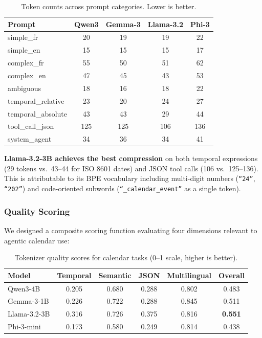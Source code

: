 \documentclass[11pt,a4paper]{article}
\begin{document}
\begin{table}[H]
\centering
\caption{Token counts across prompt categories. Lower is better.}
\label{tab:token_counts}
\small
\begin{tabular}{lcccc}
\toprule
\textbf{Prompt} & \textbf{Qwen3} & \textbf{Gemma-3} & \textbf{Llama-3.2} & \textbf{Phi-3} \\
\midrule
simple\_fr & 20 & 19 & 19 & 22 \\
simple\_en & 15 & 15 & 15 & 17 \\
complex\_fr & 55 & 50 & 51 & 62 \\
complex\_en & 47 & 45 & 43 & 53 \\
ambiguous & 18 & 16 & 18 & 22 \\
temporal\_relative & 23 & 20 & 24 & 27 \\
temporal\_absolute & 43 & 43 & 29 & 44 \\
tool\_call\_json & 125 & 125 & 106 & 136 \\
system\_agent & 34 & 36 & 34 & 41 \\
\bottomrule
\end{tabular}
\end{table}

\textbf{Llama-3.2-3B achieves the best compression} on both temporal expressions (29 tokens vs.\ 43--44 for ISO 8601 dates) and JSON tool calls (106 vs.\ 125--136). This is attributable to its BPE vocabulary including multi-digit numbers (\texttt{``24''}, \texttt{``202''}) and code-oriented subwords (\texttt{``\_calendar\_event''} as a single token).

\subsubsection{Quality Scoring}

We designed a composite scoring function evaluating four dimensions relevant to agentic calendar use:

\begin{table}[H]
\centering
\caption{Tokenizer quality scores for calendar tasks (0--1 scale, higher is better).}
\label{tab:quality_scores}
\begin{tabular}{lccccc}
\toprule
\textbf{Model} & \textbf{Temporal} & \textbf{Semantic} & \textbf{JSON} & \textbf{Multilingual} & \textbf{Overall} \\
\midrule
Qwen3-4B & 0.205 & 0.680 & 0.288 & 0.802 & 0.483 \\
Gemma-3-1B & 0.226 & 0.722 & 0.288 & 0.845 & 0.511 \\
Llama-3.2-3B & 0.316 & 0.726 & 0.375 & 0.816 & \textbf{0.551} \\
Phi-3-mini & 0.173 & 0.580 & 0.249 & 0.814 & 0.438 \\
\bottomrule
\end{tabular}
\end{table}
\end{document}
